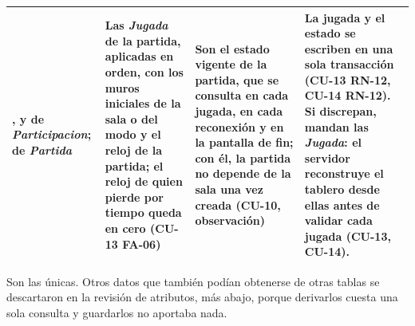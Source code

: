 \begin{center}
\begin{longtable}{|L{0.19\textwidth}|L{0.20\textwidth}|L{0.24\textwidth}|L{0.25\textwidth}|}
,  y  de \textit{Participacion};  de \textit{Partida} & Las \textit{Jugada} de la partida, aplicadas en orden, con los muros iniciales de la sala o del modo y el reloj de la partida; el reloj de quien pierde por tiempo queda en cero (\mbox{CU-13} \mbox{FA-06}) & Son el estado vigente de la partida, que se consulta en cada jugada, en cada reconexión y en la pantalla de fin; con él, la partida no depende de la sala una vez creada (\mbox{CU-10}, observación) & La jugada y el estado se escriben en una sola transacción (\mbox{CU-13} \mbox{RN-12}, \mbox{CU-14} \mbox{RN-12}). Si discrepan, mandan las \textit{Jugada}: el servidor reconstruye el tablero desde ellas antes de validar cada jugada (\mbox{CU-13}, \mbox{CU-14}). \\ \hline
\end{longtable}
\end{center}

Son las únicas. Otros datos que también podían obtenerse de otras tablas se descartaron en la revisión de atributos, más abajo, porque derivarlos cuesta una sola consulta y guardarlos no aportaba nada.
